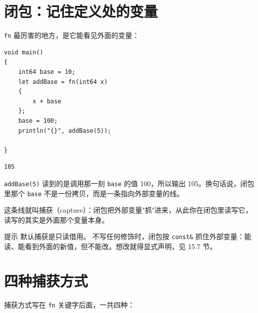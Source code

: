 \section{闭包：记住定义处的变量}

\texttt{fn} 最厉害的地方，是它能看见外面的变量：

\par
\medskip
\begin{lstlisting}[style=chali]
void main()
{
    int64 base = 10;
    let addBase = fn(int64 x)
    {
        x + base
    };
    base = 100;
    println("{}", addBase(5));

}
\end{lstlisting}
\par
\medskip

\par
\medskip
\begin{lstlisting}[style=out]
105
\end{lstlisting}
\par
\medskip

\texttt{add\allowbreak{}Base(\allowbreak{}5)\allowbreak{}} 读到的是调用那一刻 \texttt{base} 的值 100，所以输出 105。换句话说，闭包里那个 \texttt{base} 不是一份拷贝，而是一条指向外部变量的线。

这条线就叫捕获（capture）：闭包把外部变量"抓"进来，从此你在闭包里读写它，读写的其实是外面那个变量本身。

\begin{tip}{提示}
默认捕获是只读借用。 不写任何修饰时，闭包按 \texttt{const\&} 抓住外部变量：能读、能看到外面的新值，但不能改。想改就得显式声明，见 15.7 节。
\end{tip}

\section{四种捕获方式}

捕获方式写在 \texttt{fn} 关键字后面，一共四种：


